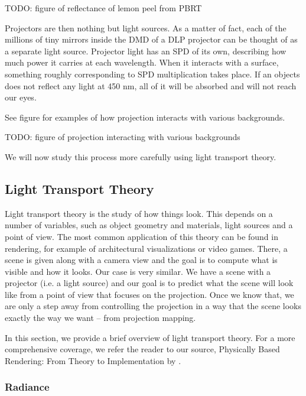 {\color{red} TODO: figure of reflectance of lemon peel from PBRT}

Projectors are then nothing but light sources. As a matter of fact, each of the millions of tiny mirrors inside the DMD of a DLP projector can be thought of as a separate light source. Projector light has an SPD of its own, describing how much power it carries at each wavelength. When it interacts with a surface, something roughly corresponding to SPD multiplication takes place. If an objects does not reflect any light at 450 nm, all of it will be absorbed and will not reach our eyes.

See figure for examples of how projection interacts with various backgrounds.

{\color{red} TODO: figure of projection interacting with various backgrounds}

We will now study this process more carefully using light transport theory.

\subsection{Light Transport Theory}
\label{section:background-projection_mapping-light_transport}

Light transport theory is the study of how things look. This depends on a number of variables, such as object geometry and materials, light sources and a point of view. The most common application of this theory can be found in rendering, for example of architectural visualizations or video games. There, a scene is given along with a camera view and the goal is to compute what is visible and how it looks. Our case is very similar. We have a scene with a projector (i.e. a light source) and our goal is to predict what the scene will look like from a point of view that focuses on the projection. Once we know that, we are only a step away from controlling the projection in a way that the scene looks exactly the way we want -- from projection mapping.

In this section, we provide a brief overview of light transport theory. For a more comprehensive coverage, we refer the reader to our source, Physically Based Rendering: From Theory to Implementation by \citet{PBRT3e}.

\subsubsection{Radiance}
\label{section:background-projection_mapping-light_transport-radiance}

